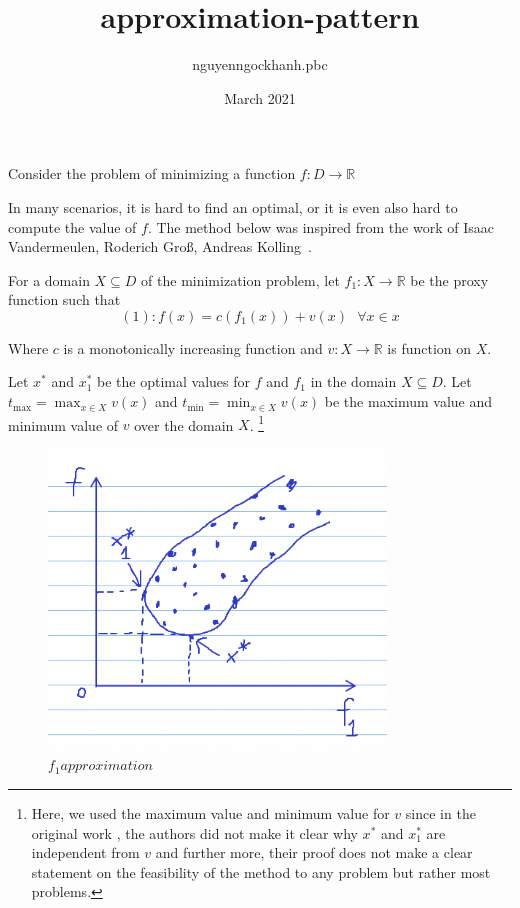 \documentclass{article}
\title{approximation-pattern}
\author{nguyenngockhanh.pbc }
\date{March 2021}
\begin{document}
    \maketitle

    Consider the problem of minimizing a function $f: D \to \mathbb{R}$

    In many scenarios, it is hard to find an optimal, or it is even also hard to compute the value of $f$.
    The method below was inspired from the work of Isaac Vandermeulen, Roderich Groß, Andreas Kolling~\cite{vandermeulen2019balanced}.

    For a domain $X \subseteq D$ of the minimization problem,  let $f_1: X \to \mathbb{R}$ be the proxy function such that
    \[
        (1): f(x) = c(f_1(x)) + v(x) \text{ } \forall x \in x
    \]

    Where $c$ is a monotonically increasing function and $v: X \to \mathbb{R}$ is function on $X$.

    Let $x^*$ and $x^*_1$ be the optimal values for $f$ and $f_1$ in the domain $X \subseteq D$.
    Let $t_{\max} = \max_{x \in X} v(x)$ and $t_{\min} = \min_{x \in X} v(x)$ be the maximum value and minimum value of $v$ over the domain $X$.  \footnote{Here, we used the maximum value and minimum value for $v$ since in the original work \cite{vandermeulen2019balanced}, the authors did not make it clear why $x^*$ and $x^*_1$ are independent from $v$ and further more, their proof does not make a clear statement on the feasibility of the method to any problem but rather most problems.}

    \begin{figure}[h!]
        \centering
        \includegraphics[width=0.8\textwidth]{f1_approximation}
        \caption{$f_1 approximation$}
        \label{fig:f1_approximation}
    \end{figure}
\end{document}

